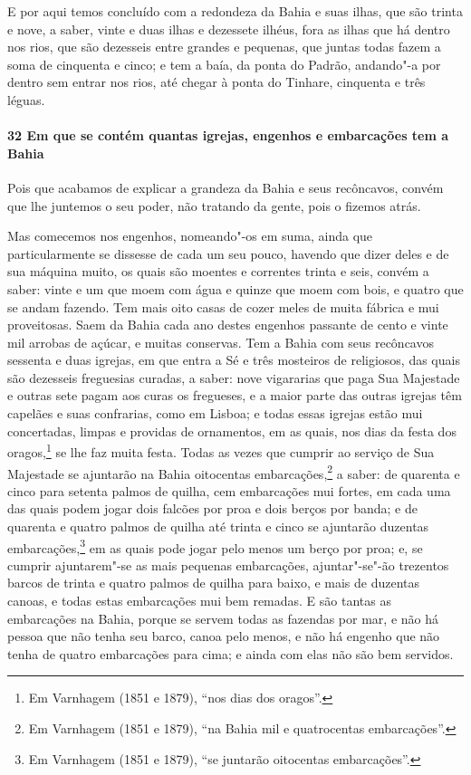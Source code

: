E por aqui temos concluído com a redondeza da Bahia e suas ilhas, que são trinta e nove, a
saber, vinte e duas ilhas e dezessete ilhéus, fora as ilhas que há dentro nos rios, que
são dezesseis entre grandes e pequenas, que juntas todas fazem a soma de cinquenta e
cinco; e tem a baía, da ponta do Padrão, andando"-a por dentro sem entrar nos rios, até
chegar à ponta do Tinhare, cinquenta e três léguas.

\paragraph{32 Em que se contém quantas igrejas, engenhos e embarcações tem a Bahia}

Pois que acabamos de explicar a grandeza da Bahia e seus recôncavos, convém que lhe
juntemos o seu poder, não tratando da gente, pois o fizemos atrás.

Mas comecemos nos engenhos, nomeando"-os em suma, ainda que particularmente se dissesse de
cada um seu pouco, havendo que dizer deles e de sua máquina muito, os quais são moentes e
correntes trinta e seis, convém a saber: vinte e um que moem com água e quinze que moem
com bois, e quatro que se andam fazendo. Tem mais oito casas de cozer meles de muita
fábrica e mui proveitosas. Saem da Bahia cada ano destes engenhos passante de cento e
vinte mil arrobas de açúcar, e muitas conservas. Tem a Bahia com seus recôncavos sessenta
e duas igrejas, em que entra a Sé e três mosteiros de religiosos, das quais são dezesseis
freguesias curadas, a saber: nove vigararias que paga Sua Majestade e outras sete pagam
aos curas os fregueses, e a maior parte das outras igrejas têm capelães e suas confrarias,
como em Lisboa; e todas essas igrejas estão mui concertadas, limpas e providas de
ornamentos, em as quais, nos dias da festa dos oragos,\footnote{ Em Varnhagem (1851 e
1879), ``nos dias dos oragos''.} se lhe faz muita
festa. Todas as vezes que cumprir ao serviço de Sua Majestade se ajuntarão na Bahia
oitocentas embarcações,\footnote{ Em Varnhagem (1851 e 1879), ``na Bahia mil e
quatrocentas embarcações''.} a saber: de quarenta e cinco para setenta palmos de quilha,
cem embarcações mui fortes, em cada uma das quais podem jogar dois falcões por proa e dois
berços por banda; e de quarenta e quatro palmos de quilha até trinta e cinco se ajuntarão
duzentas embarcações,\footnote{ Em Varnhagem (1851 e 1879), ``se juntarão oitocentas
embarcações''.} em as quais pode jogar pelo menos um berço por proa; e, se cumprir
ajuntarem"-se as mais pequenas embarcações, ajuntar"-se"-ão trezentos barcos de trinta e
quatro palmos de quilha para baixo, e mais de duzentas canoas, e todas estas embarcações
mui bem remadas. E são tantas as embarcações na Bahia, porque se servem todas as fazendas
por mar, e não há pessoa que não tenha seu barco, canoa pelo menos, e não há engenho que
não tenha de quatro embarcações para cima; e ainda com elas não são bem servidos.

